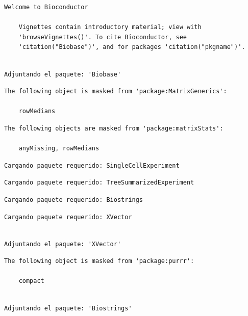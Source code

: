 \documentclass[
  letterpaper,
  DIV=11,
  numbers=noendperiod]{scrartcl}
\begin{document}
\begin{verbatim}
Welcome to Bioconductor

    Vignettes contain introductory material; view with
    'browseVignettes()'. To cite Bioconductor, see
    'citation("Biobase")', and for packages 'citation("pkgname")'.
\end{verbatim}

\begin{verbatim}

Adjuntando el paquete: 'Biobase'
\end{verbatim}

\begin{verbatim}
The following object is masked from 'package:MatrixGenerics':

    rowMedians
\end{verbatim}

\begin{verbatim}
The following objects are masked from 'package:matrixStats':

    anyMissing, rowMedians
\end{verbatim}

\begin{verbatim}
Cargando paquete requerido: SingleCellExperiment
\end{verbatim}

\begin{verbatim}
Cargando paquete requerido: TreeSummarizedExperiment
\end{verbatim}

\begin{verbatim}
Cargando paquete requerido: Biostrings
\end{verbatim}

\begin{verbatim}
Cargando paquete requerido: XVector
\end{verbatim}

\begin{verbatim}

Adjuntando el paquete: 'XVector'
\end{verbatim}

\begin{verbatim}
The following object is masked from 'package:purrr':

    compact
\end{verbatim}

\begin{verbatim}

Adjuntando el paquete: 'Biostrings'
\end{verbatim}
\end{document}
